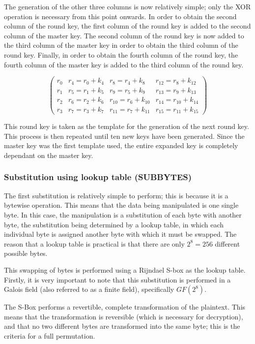 \documentclass[12pt]{report}
\theoremstyle{definition}
\theoremstyle{remark}
\begin{document}
The generation of the other three columns is now relatively simple; only the XOR operation is necessary from this point onwards. In order to obtain the second column of the round key, the first column of the round key is added to the second column of the master key. The second column of the round key is now added to the third column of the master key in order to obtain the third column of the round key. Finally, in order to obtain the fourth column of the round key, the fourth column of the master key is added to the third column of the round key.

\[ \left( \begin{array}{cccc}
r_0 & r_4=r_0+k_4 & r_8=r_4+k_8 & r_{12}=r_8+k_{12} \\
r_1 & r_5=r_1+k_5 & r_9=r_5+k_9 & r_{13}=r_9+k_{13} \\
r_2 & r_6=r_2+k_6 & r_{10}=r_6+k_{10} & r_{14}=r_{10}+k_{14} \\
r_3 & r_7=r_3+k_7 & r_{11}=r_7+k_{11} & r_{15}=r_{11}+k_{15}\end{array} \right) \]

This round key is taken as the template for the generation of the next round key. This process is then repeated until ten new keys have been generated. Since the master key was the first template used, the entire expanded key is completely dependant on the master key.

\subsubsection{Substitution using lookup table (SUBBYTES)}
The first substitution is relatively simple to perform; this is because it is a bytewise operation. This means that the data being manipulated is one single byte. In this case, the manipulation is a substitution of each byte with another byte, the substitution being determined by a lookup table, in which each individual byte is assigned another byte with which it must be swapped. The reason that a lookup table is practical is that there are only $2^8 = 256$ different possible bytes.

This swapping of bytes is performed using a Rijndael S-box as the lookup table. Firstly, it is very important to note that this substitution is performed in a Galois field (also referred to as a finite field)\cite{GaloisField}, specifically $GF(2^8)$.

The S-Box performs a revertible, complete transformation of the plaintext\cite{SBox}. This means that the transformation is reversible (which is necessary for decryption), and that no two different bytes are transformed into the same byte; this is the criteria for a full permutation.
\end{document}
